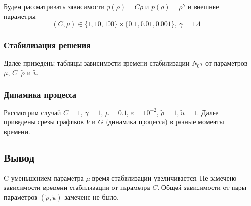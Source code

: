Будем рассматривать зависимости 
$ p(\rho) = C \rho $ и $p(\rho) = \rho^{\gamma}$
и внешние параметры 
$$ (C, \mu) \in \{1, 10, 100\} \times \{0.1, 0.01, 0.001\}, \; \gamma = 1.4$$

\subsubsection{Стабилизация решения}
Далее приведены таблицы зависимости времени стабилизации $N_0 \tau$ 
от параметров $\mu$, $C$, $\tilde \rho$ и $\tilde u$.


\subsubsection{Динамика процесса}
Рассмотрим случай $C = 1$, $\gamma = 1$, $\mu = 0.1$, $\varepsilon = 10^{-2}$, $\tilde \rho = 1$, $\tilde u = 1$.
Далее приведены срезы графиков $V$ и $G$ (динамика процесса) в разные моменты времени.



\subsection{Вывод}
C уменьшением параметра $\mu$ время стабилизации увеличивается. 
Не замечено зависимости времени стабилизации от параметра $C$.
Общей зависимости от пары параметров $(\tilde \rho, \tilde u)$ замечено не было.
